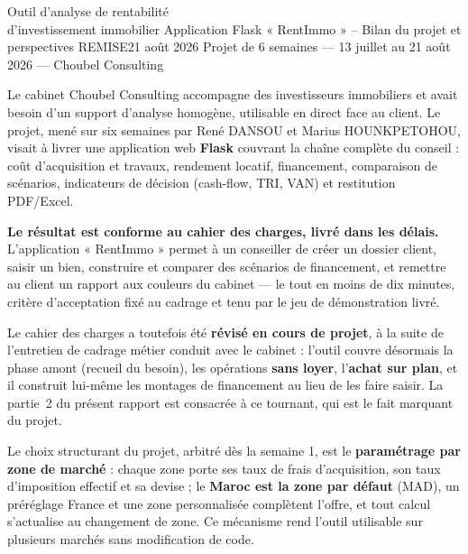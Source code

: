\documentclass[11pt,a4paper]{article}
\begin{document}
	{Outil d'analyse de rentabilité \\ d'investissement immobilier}
	{Application Flask « RentImmo » -- Bilan du projet et perspectives}
	{REMISE}{21 août 2026}
	{Projet de 6 semaines — 13 juillet au 21 août 2026 — Choubel Consulting}


Le cabinet Choubel Consulting accompagne des investisseurs immobiliers et avait besoin d'un support d'analyse homogène, utilisable en direct face au client. Le projet, mené sur six semaines par René DANSOU et Marius HOUNKPETOHOU, visait à livrer une application web \textbf{Flask} couvrant la chaîne complète du conseil : coût d'acquisition et travaux, rendement locatif, financement, comparaison de scénarios, indicateurs de décision (cash-flow, TRI, VAN) et restitution PDF/Excel.

\textbf{Le résultat est conforme au cahier des charges, livré dans les délais.} L'application « RentImmo » permet à un conseiller de créer un dossier client, saisir un bien, construire et comparer des scénarios de financement, et remettre au client un rapport aux couleurs du cabinet — le tout en moins de dix minutes, critère d'acceptation fixé au cadrage et tenu par le jeu de démonstration livré.

Le cahier des charges a toutefois été \textbf{révisé en cours de projet}, à la suite de l'entretien de cadrage métier conduit avec le cabinet : l'outil couvre désormais la phase amont (recueil du besoin), les opérations \textbf{sans loyer}, l'\textbf{achat sur plan}, et il construit lui-même les montages de financement au lieu de les faire saisir. La partie~2 du présent rapport est consacrée à ce tournant, qui est le fait marquant du projet.

Le choix structurant du projet, arbitré dès la semaine 1, est le \textbf{paramétrage par zone de marché} : chaque zone porte ses taux de frais d'acquisition, son taux d'imposition effectif et sa devise ; le \textbf{Maroc est la zone par défaut} (MAD), un préréglage France et une zone personnalisée complètent l'offre, et tout calcul s'actualise au changement de zone. Ce mécanisme rend l'outil utilisable sur plusieurs marchés sans modification de code.
\end{document}
